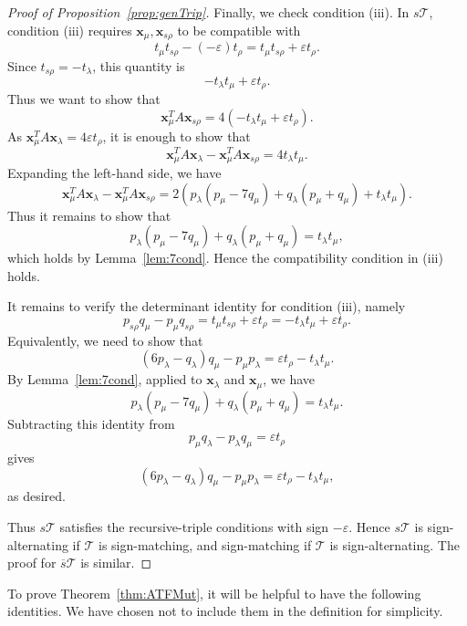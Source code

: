 \documentclass[11pt, reqno]{amsart}
\theoremstyle{remark}
\numberwithin{equation}{subsection}
\numberwithin{figure}{section}
\theoremstyle{customremark}
\newcommand{\Tt}{\mathcal{T}}
\newcommand{\ov}{\overline}
\newcommand{\eps}{\varepsilon}
\begin{document}
\begin{proof}[Proof of Proposition~\ref{prop:genTrip}]
Finally, we check condition (iii). In $s\Tt$, condition (iii) requires $\bm{x}_\mu,\bm{x}_{s\rho}$ to be compatible with
\[
t_\mu t_{s\rho}-(-\eps)t_\rho=t_\mu t_{s\rho}+\eps t_\rho.
\]
Since $t_{s\rho}=-t_\lambda$, this quantity is
\[
-t_\lambda t_\mu+\eps t_\rho.
\]
Thus we want to show that
\[
\bm{x}_\mu^TA\bm{x}_{s\rho}=4(-t_\lambda t_\mu+\eps t_\rho).
\]
As $\bm{x}_\mu^TA\bm{x}_\lambda=4\eps t_\rho$, it is enough to show that
\[
\bm{x}_\mu^TA\bm{x}_\lambda-\bm{x}_\mu^TA\bm{x}_{s\rho}
=
4t_\lambda t_\mu.
\]
Expanding the left-hand side, we have
\[
\bm{x}_\mu^TA\bm{x}_\lambda-\bm{x}_\mu^TA\bm{x}_{s\rho}
=
2(p_\lambda(p_\mu-7q_\mu)+q_\lambda(p_\mu+q_\mu)+t_\lambda t_\mu).
\]
Thus it remains to show that
\[
p_\lambda(p_\mu-7q_\mu)+q_\lambda(p_\mu+q_\mu)=t_\lambda t_\mu,
\]
which holds by Lemma~\ref{lem:7cond}. Hence the compatibility condition in (iii) holds.

It remains to verify the determinant identity for condition (iii), namely
\[
p_{s\rho}q_\mu-p_\mu q_{s\rho}
=
t_\mu t_{s\rho}+\eps t_\rho
=
-t_\lambda t_\mu+\eps t_\rho.
\]
Equivalently, we need to show that
\[
(6p_\lambda-q_\lambda)q_\mu-p_\mu p_\lambda
=
\eps t_\rho-t_\lambda t_\mu.
\]
By Lemma~\ref{lem:7cond}, applied to $\bm{x}_\lambda$ and $\bm{x}_\mu$, we have
\[
p_\lambda(p_\mu-7q_\mu)+q_\lambda(p_\mu+q_\mu)=t_\lambda t_\mu.
\]
Subtracting this identity from
\[
p_\mu q_\lambda-p_\lambda q_\mu=\eps t_\rho
\]
gives
\[
(6p_\lambda-q_\lambda)q_\mu-p_\mu p_\lambda
=
\eps t_\rho-t_\lambda t_\mu,
\]
as desired.

Thus $s\Tt$ satisfies the recursive-triple conditions with sign $-\eps$. Hence $s\Tt$ is sign-alternating if $\Tt$ is sign-matching, and sign-matching if $\Tt$ is sign-alternating. The proof for $\ov{s}\Tt$ is similar.

\end{proof}

To prove Theorem~\ref{thm:ATFMut}, it will be helpful to have the following identities. We have chosen not to include them in the definition for simplicity. 
\end{document}
